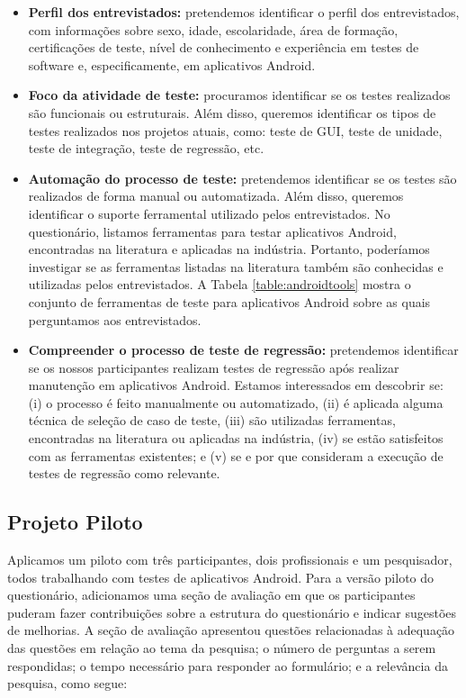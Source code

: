 \begin{itemize}
    \item \textbf{Perfil dos entrevistados:} pretendemos identificar o perfil dos entrevistados, com informações sobre sexo, idade, escolaridade, área de formação, certificações de teste, nível de conhecimento e experiência em testes de software e, especificamente, em aplicativos Android.
    
    \item \textbf{Foco da atividade de teste:} procuramos identificar se os testes realizados são funcionais ou estruturais. Além disso, queremos identificar os tipos de testes realizados nos projetos atuais, como: teste de \ac{GUI}, teste de unidade, teste de integração, teste de regressão, etc.
    
    \item \textbf{Automação do processo de teste:} pretendemos identificar se os testes são realizados de forma manual ou automatizada. Além disso, queremos identificar o suporte ferramental utilizado pelos entrevistados. No questionário, listamos ferramentas para testar aplicativos Android, encontradas na literatura e aplicadas na indústria. Portanto, poderíamos investigar se as ferramentas listadas na literatura também são conhecidas e utilizadas pelos entrevistados. A Tabela \ref{table:androidtools} mostra o conjunto de ferramentas de teste para aplicativos Android sobre as quais perguntamos aos entrevistados.
    
    \item \textbf{Compreender o processo de teste de regressão:} pretendemos identificar se os nossos participantes realizam testes de regressão após realizar manutenção em aplicativos Android. Estamos interessados em descobrir se: (i) o processo é feito manualmente ou automatizado, (ii) é aplicada alguma técnica de seleção de caso de teste, (iii) são utilizadas ferramentas, encontradas na literatura ou aplicadas na indústria, (iv) se estão satisfeitos com as ferramentas existentes; e (v) se e por que consideram a execução de testes de regressão como relevante.
    
\end{itemize}

\subsection{Projeto Piloto}

Aplicamos um piloto com três participantes, dois profissionais e um pesquisador, todos trabalhando com testes de aplicativos Android. Para a versão piloto do questionário, adicionamos uma seção de avaliação em que os participantes puderam fazer contribuições sobre a estrutura do questionário e indicar sugestões de melhorias. A seção de avaliação apresentou questões relacionadas à adequação das questões em relação ao tema da pesquisa; o número de perguntas a serem respondidas; o tempo necessário para responder ao formulário; e a relevância da pesquisa, como segue:


